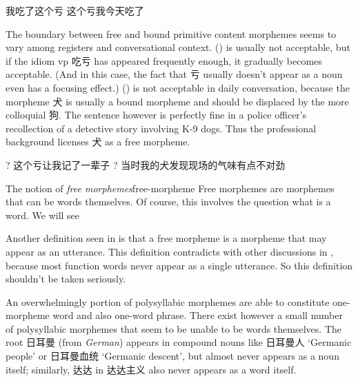 \documentclass[UTF8, a4paper, oneside, scheme=plain]{ctexrep}
\newcommand*{\citesec}[1]{\S~{#1}}
\newcommand*{\term}[1]{\emph{#1}}
\newcommand{\corpus}[1]{\emph{#1}}
\newcommand{\translate}[1]{`#1'}
\begin{document}
\begin{exe}
    \ex\label{ex:pos.morpheme.chikui} \begin{xlist}
        \ex 我吃了这个亏
        \ex 这个亏我今天吃了
    \end{xlist}
\end{exe}

The boundary between free and bound primitive content morphemes 
seems to vary among registers and conversational context. 
() is usually not acceptable,
but if the idiom \acs{vp} 吃亏 has appeared frequently enough, 
it gradually becomes acceptable.
(And in this case, the fact that 亏 usually doesn't appear as a noun 
even has a focusing effect.)
() is not acceptable in daily conversation,
because the morpheme 犬 is usually a bound morpheme 
and should be displaced by the more colloquial 狗.
The sentence however is perfectly fine in 
a police officer's recollection of a detective story involving K-9 dogs.
Thus the professional background licenses 犬 as a free morpheme.

\begin{exe}
    \ex\label{ex:pos.morpheme.kui-2} 
    ? 这个亏让我记了一辈子
    \ex\label{ex:pos.morpheme.quan} 
    ? 当时我的犬发现现场的气味有点不对劲
\end{exe}

\begin{infobox}{The notion of \term{free morphemes}}{free-morpheme}
    Free morphemes are morphemes that can be words themselves.
    Of course, this involves the question what is a word. 
    We will see 

    Another definition seen in \citet[\citesec{1.1.2}]{zhudexigrammar}
    is that a free morpheme is a morpheme that may appear as an utterance.
    This definition contradicts with other discussions in \citet{zhudexigrammar},
    because most function words never appear as a single utterance.
    So this definition shouldn't be taken seriously.
\end{infobox}

An overwhelmingly portion of polysyllabic morphemes 
are able to constitute one-morpheme word and also one-word phrase.
There exist however a small number of polysyllabic morphemes 
that seem to be unable to be words themselves. 
The root 日耳曼 (from \corpus{German}) 
appears in compound nouns like 日耳曼人 \translate{Germanic people} 
or 日耳曼血统 \translate{Germanic descent}, 
but almost never appears as a noun itself; 
similarly, 达达 in 达达主义 also never appears as a word itself.
\end{document}
